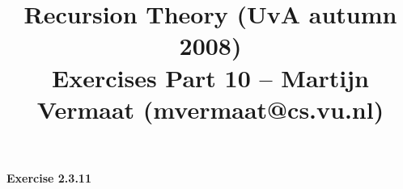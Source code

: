 \documentclass[a4paper,11pt]{article}
\title{Recursion Theory (UvA autumn 2008)\\
\normalsize{Exercises Part 10 -- Martijn Vermaat (mvermaat@cs.vu.nl)}}
\date{}
\begin{document}
\maketitle


\paragraph{Exercise 2.3.11}
\end{document}
